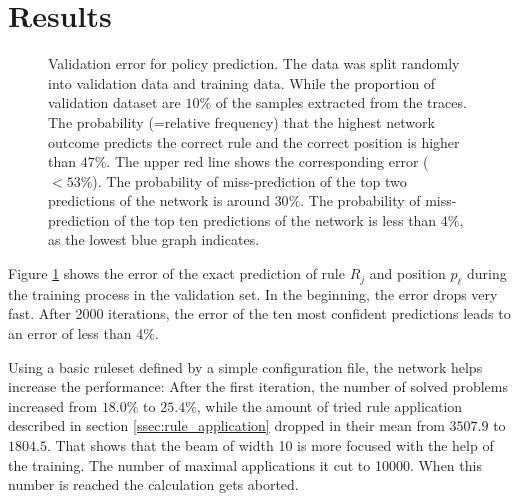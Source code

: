 \documentclass{scrartcl}
\theoremstyle{definition}
\begin{document}
\section{Results}

\begin{figure}[!htbp]
	\centering
	
	\caption{Validation error for policy prediction. The data was split randomly into validation data and training data.
	While the proportion of validation dataset are $10\%$ of the samples extracted from the traces.
	The probability (=relative frequency) that the highest network outcome predicts the correct rule and the correct position is higher than $ 47\%$.
	The upper red line shows the corresponding error ($<53\%$).
	The probability of miss-prediction of the top two predictions of the network is around $30\%$.
	The probability of miss-prediction of the top ten predictions of the network is less than $4\%$, as the lowest blue graph indicates.
	}
	\label{fig:training}
\end{figure}

Figure \ref{fig:training} shows the error of the exact prediction of rule $R_j$ and position $p_\ell$ during the training process in the validation set.
In the beginning, the error drops very fast. After 2000 iterations, the error of the ten most confident predictions leads to an error of less than $4\%$.

Using a basic ruleset defined by a simple configuration file, the network helps increase the performance:
After the first iteration, the number of solved problems increased from $18.0\%$ to $25.4\%$,
while the amount of tried rule application described in section \ref{ssec:rule_application} dropped in their mean from $3507.9$ to $1804.5$.
That shows that the beam of width 10 is more focused with the help of the training.
The number of maximal applications it cut to 10000. When this number is reached the calculation gets aborted.


\end{document}
